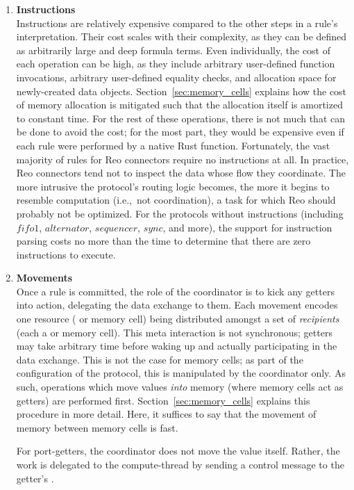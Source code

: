 \begin{enumerate}
	
	\item \textbf{Instructions}\\
	Instructions are relatively expensive compared to the other steps in a rule's interpretation. Their cost scales with their complexity, as they can be defined as arbitrarily large and deep formula terms. Even individually, the cost of each operation can be high, as they include arbitrary user-defined function invocations, arbitrary user-defined equality checks, and allocation space for newly-created data objects. Section~\ref{sec:memory_cells} explains how the cost of memory allocation is mitigated such that the allocation itself is amortized to constant time. For the rest of these operations, there is not much that can be done to avoid the cost; for the most part, they would be expensive even if each rule were performed by a native Rust function. Fortunately, the vast majority of rules for Reo connectors require no instructions at all. In practice, Reo connectors tend not to inspect the data whose flow they coordinate. The more intrusive the protocol's routing logic becomes, the more it begins to resemble computation (i.e.,\ not coordination), a task for which Reo should probably not be optimized. For the protocols without instructions (including $fifo1$, $alternator$, $sequencer$, $sync$, and more), the support for instruction parsing costs no more than the time to determine that there are zero instructions to execute.
	
	\item \textbf{Movements}\\
	Once a rule is committed, the role of the coordinator is to kick any getters into action, delegating the data exchange to them. Each movement encodes one resource ( or memory cell) being distributed amongst a set of \textit{recipients} (each a  or memory cell). This meta interaction is not synchronous; getters may take arbitrary time before waking up and actually participating in the data exchange. This is not the case for memory cells; as part of the configuration of the protocol, this is manipulated by the coordinator only. As such, operations which move values \textit{into} memory (where memory cells act as getters) are performed first. Section~\ref{sec:memory_cells} explains this procedure in more detail. Here, it suffices to say that the movement of memory between memory cells is fast.
	
	For port-getters, the coordinator does not move the value itself. Rather, the work is delegated to the compute-thread by sending a control message to the getter's . 
	

\end{enumerate}
